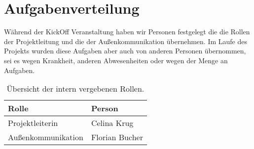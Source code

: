 \chapter{Aufgabenverteilung}

    Während der KickOff Veranstaltung haben wir Personen festgelegt die die Rollen der Projektleitung und die der Außenkommunikation übernehmen. Im Laufe des Projekts wurden diese Aufgaben aber auch von anderen Personen übernommen, sei es wegen Krankheit, anderen Abwesenheiten oder wegen der Menge an Aufgaben.

    \begin{table}[H]
        \centering
        \begin{tabularx}{\textwidth}{ | l | X | }
            \hline
                \textbf{Rolle} & \textbf{Person} \\
            \hline
                Projektleiterin & Celina Krug \\ 
            \hline
                Außenkommunikation & Florian Bucher \\ 
            \hline
        \end{tabularx}
        \caption{Übersicht der intern vergebenen Rollen.}
        \label{table:roles}
    \end{table}

